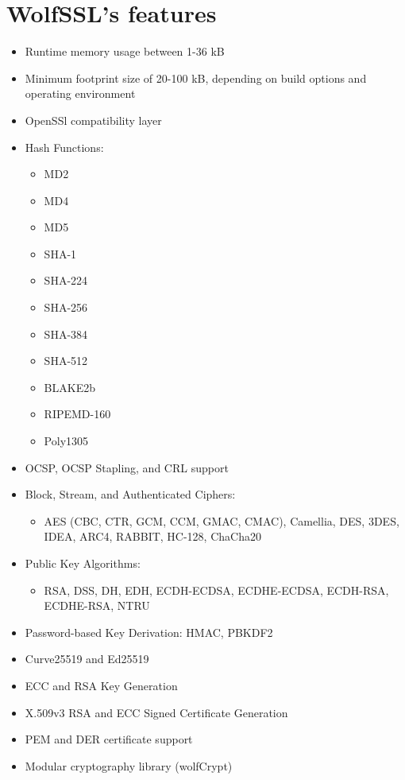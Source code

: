 \documentclass[a4paper,12pt]{report}
\begin{document}
\section{WolfSSL's features}
\begin{itemize}
\item Runtime memory usage between 1-36 kB
\item Minimum footprint size of 20-100 kB, depending on build options and operating environment
\item OpenSSl compatibility layer
\item Hash Functions: \begin{multicols}{3}\begin{itemize}
\item MD2
\item MD4
\item MD5
\item SHA-1
\item SHA-224
\item SHA-256
\item SHA-384
\item SHA-512
\item BLAKE2b
\item RIPEMD-160
\item Poly1305
\end{itemize}
\end{multicols}
\item OCSP, OCSP Stapling, and CRL support
\item Block, Stream, and Authenticated Ciphers:
\begin{itemize}
\item AES (CBC, CTR, GCM, CCM, GMAC, CMAC), Camellia, DES, 3DES, IDEA, ARC4, RABBIT, HC-128, ChaCha20
\end{itemize}
\item Public Key Algorithms:
\begin{itemize}
\item RSA, DSS, DH, EDH, ECDH-ECDSA, ECDHE-ECDSA, ECDH-RSA, ECDHE-RSA, NTRU
\end{itemize}
\item Password-based Key Derivation: HMAC, PBKDF2
\item Curve25519 and Ed25519
\item ECC and RSA Key Generation
\item X.509v3 RSA and ECC Signed Certificate Generation
\item PEM and DER certificate support
\item Modular cryptography library (wolfCrypt)

\end{itemize}
\end{document}
